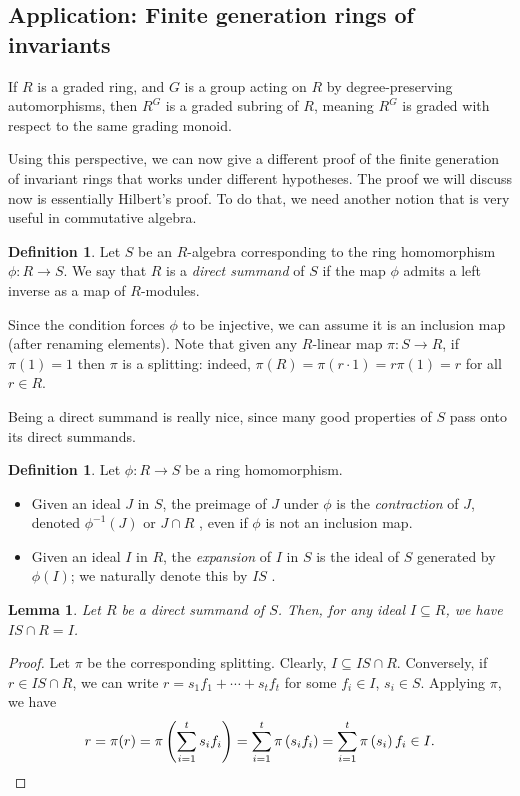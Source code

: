 \documentclass{amsart}[12pt]
\newcommand{\DEF}[1]{\emph{#1}\index{#1}}
\newcommand{\Def}[1]{#1 \index{#1}}
\numberwithin{equation}{section}
\theoremstyle{plain} %
\newtheorem{lemma}[equation]{Lemma}
\theoremstyle{definition}
\newtheorem{defn}[equation]{Definition}
\newtheorem{definition}[equation]{Definition}
\theoremstyle{remark}
\newcommand{\ssec}[1]{\subsection{#1}}
\begin{document}
\ssec{Application: Finite generation rings of invariants}

If $R$ is a graded ring, and $G$ is a group acting on $R$ by degree-preserving automorphisms, then $R^G$ is a graded subring of $R$, meaning $R^G$ is graded with respect to the same grading monoid.

Using this perspective, we can now give a different proof of the finite generation of invariant rings that works under different hypotheses. The proof we will discuss now is essentially Hilbert's proof. To do that, we need another notion that is very useful in commutative algebra.

\begin{definition} 
Let $S$ be an $R$-algebra corresponding to the ring homomorphism $\phi:R \to S$. We say that $R$ is a {\em direct summand} of $S$ if the map $\phi$ admits a left inverse as a map of $R$-modules.
\end{definition}

Since the condition forces $\phi$ to be injective, we can assume it is an inclusion map (after renaming elements). Note that given any $R$-linear map $\pi: S \to R$, if $\pi(1)=1$ then $\pi$ is a splitting: indeed, $\pi(R)=\pi(r \cdot 1) = r \pi(1)=r$ for all $r \in R$.


Being a direct summand is really nice, since many good properties of $S$ pass onto its direct summands.

\begin{defn} Let $\phi:R\to S$ be a ring homomorphism.
\begin{itemize}
\item Given an ideal $J$ in $S$, the preimage of $J$ under $\phi$ is the \DEF{contraction} of $J$, denoted \Def{$\phi^{-1}(J)$} or \Def{$J \cap R$}, even if $\phi$ is not an inclusion map.
\item Given an ideal $I$ in $R$, the \DEF{expansion} of $I$ in $S$ is the ideal of $S$ generated by $\phi(I)$; we naturally denote this by \Def{$IS$}.
\end{itemize}
\end{defn}


\begin{lemma}\label{direct summand ideals contract}
Let $R$ be a direct summand of $S$. Then, for any ideal $I \subseteq R$, we have $IS \cap R=I$.
\end{lemma}

\begin{proof}
	Let $\pi$ be the corresponding splitting. Clearly, $I \subseteq IS \cap R$. Conversely, if $r \in IS \cap R$, we can write $r = s_1 f_1 + \cdots + s_t f_t$ for some $f_i \in I$, $s_i \in S$. Applying $\pi$, we have
	\[r = \pi(r) = \pi \left( \sum_{i=1}^t s_i f_i \right) = \sum_{i=1}^t \pi\left( s_i f_i \right) = \sum_{i=1}^t \pi \left( s_i \right) f_i \in I.\qedhere\]
\end{proof}
\end{document}

